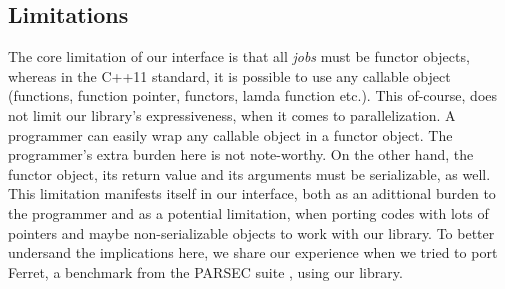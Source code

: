 \subsection{Limitations}
\label{sect:interface_limitations}
The core limitation of our interface is that all \emph{jobs} must be functor objects,
whereas in the C++11 standard, it is possible to use any callable object (functions, function pointer, functors,
lamda function etc.).  	This of-course, does not limit our library's expressiveness, when it comes to parallelization.
A programmer can easily wrap any callable object in a functor object.  The programmer's extra burden here is not 
note-worthy.  On the other hand,  the functor object, its return value and its arguments must be serializable, as well.  
This limitation manifests itself in our interface, both as an adittional burden to the programmer and as a potential
limitation, when porting codes with lots of pointers and maybe non-serializable objects to work with our library.
To better undersand the implications here, we share our experience when we tried to port Ferret, a benchmark from
the PARSEC suite \cite{FIXME}, using our library.

